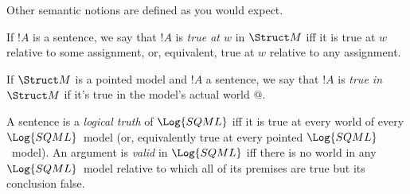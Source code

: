 \documentclass[../../../../include/open-logic-section]{subfiles}
\begin{document}
Other semantic notions are defined as you would expect.

If $!A$ is a sentence, we say that $!A$ is \emph{true at $w$} in 
$\Struct M$ iff it is true at $w$ relative to some assignment, or,
equivalent, true at $w$ relative to any assignment.

If $\Struct M$ is a pointed model and $!A$ a sentence, we say that
$!A$ is \emph{true in} $\Struct M$ if it's true in the model's actual
world $@$.

A sentence is a \emph{logical truth} of $\Log{SQML}$ iff it is true at
every world of every $\Log{SQML}$~model (or, equivalently true at
every pointed $\Log{SQML}$~model). An argument is \emph{valid} in
$\Log{SQML}$ iff there is no world in any $\Log{SQML}$~model relative to
which all of its premises are true but its conclusion false.

\end{document}
